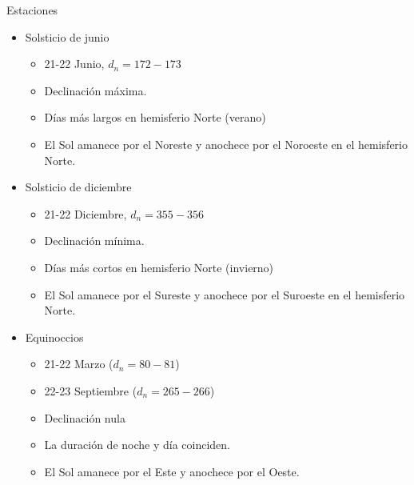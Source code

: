 \documentclass[xcolor={usenames,svgnames,dvipsnames}]{beamer}
\begin{document}
\begin{frame}[label={sec:orgcab6533}]{Estaciones}
\begin{itemize}[<+->]
\item \alert{Solsticio de junio} 
\begin{itemize}[<.->]
\item 21-22 Junio, \(d_n = 172-173\)

\item Declinación máxima.

\item Días más largos en hemisferio Norte (verano)

\item El Sol amanece por el Noreste y anochece por el Noroeste en el
hemisferio Norte.
\end{itemize}

\item \alert{Solsticio de diciembre} 
\begin{itemize}[<.->]
\item 21-22 Diciembre, \(d_n = 355-356\)

\item Declinación mínima.

\item Días más cortos en hemisferio Norte (invierno)

\item El Sol amanece por el Sureste y anochece por el Suroeste en el
hemisferio Norte.
\end{itemize}

\item \alert{Equinoccios} 
\begin{itemize}[<.->]
\item 21-22 Marzo (\(d_n = 80-81\))

\item 22-23 Septiembre (\(d_n = 265-266\))

\item Declinación nula

\item La duración de noche y día coinciden.

\item El Sol amanece por el Este y anochece por el Oeste.
\end{itemize}
\end{itemize}
\end{frame}
\end{document}
